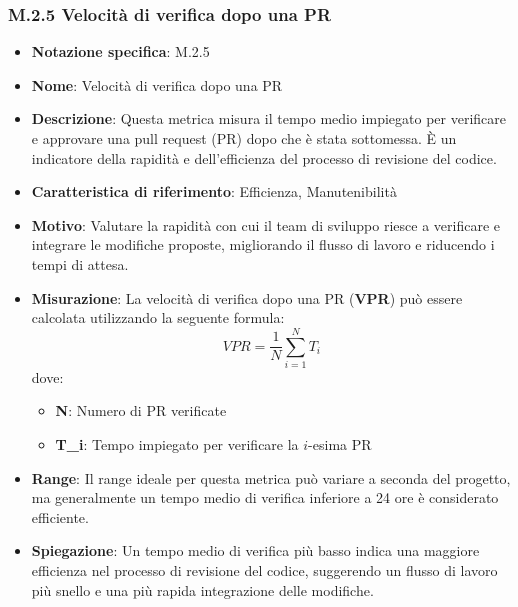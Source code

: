 \subsubsection{M.2.5 Velocità di verifica dopo una PR}
\begin{itemize}
    \item \textbf{Notazione specifica}: M.2.5
    \item \textbf{Nome}: Velocità di verifica dopo una PR
    \item \textbf{Descrizione}: Questa metrica misura il tempo medio impiegato per verificare e approvare una pull request (PR) dopo che è stata sottomessa. È un indicatore della rapidità e dell'efficienza del processo di revisione del codice.
    \item \textbf{Caratteristica di riferimento}: Efficienza, Manutenibilità
    \item \textbf{Motivo}: Valutare la rapidità con cui il team di sviluppo riesce a verificare e integrare le modifiche proposte, migliorando il flusso di lavoro e riducendo i tempi di attesa.
    \item \textbf{Misurazione}: La velocità di verifica dopo una PR (\textbf{VPR}) può essere calcolata utilizzando la seguente formula:
    \[ VPR = \frac{1}{N} \sum_{i=1}^{N} T_i \]
    dove:
    \begin{itemize}
        \item \textbf{N}: Numero di PR verificate
        \item \textbf{T_i}: Tempo impiegato per verificare la \(i\)-esima PR
    \end{itemize}
    \item \textbf{Range}: Il range ideale per questa metrica può variare a seconda del progetto, ma generalmente un tempo medio di verifica inferiore a 24 ore è considerato efficiente.
    \item \textbf{Spiegazione}: Un tempo medio di verifica più basso indica una maggiore efficienza nel processo di revisione del codice, suggerendo un flusso di lavoro più snello e una più rapida integrazione delle modifiche.
\end{itemize}
